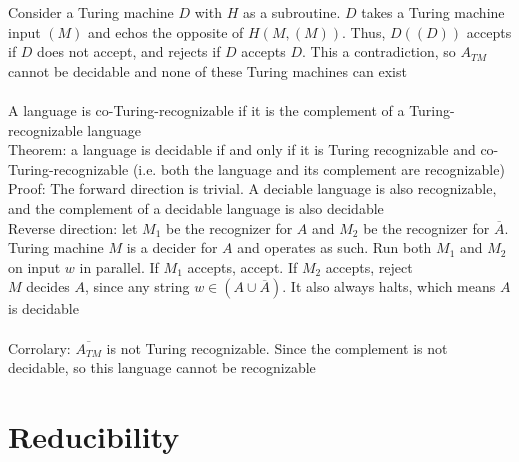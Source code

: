 \documentclass{article}
\newcommand*{\<}{\langle}
\renewcommand*{\>}{\rangle}
\begin{document}
			Consider a Turing machine $D$ with $H$ as a subroutine. $D$ takes a Turing machine input $(M)$ and echos the opposite of $H(M, (M))$. Thus, $D((D))$ accepts if $D$ does not accept, and rejects if $D$ accepts $D$. This a contradiction, so $A_{TM}$ cannot be decidable and none of these Turing machines can exist \\
			\\
			A language is co-Turing-recognizable if it is the complement of a Turing-recognizable language \\
			Theorem: a language is decidable if and only if it is Turing recognizable and co-Turing-recognizable (i.e. both the language and its complement are recognizable) \\
			Proof: The forward direction is trivial. A deciable language is also recognizable, and the complement of a decidable language is also decidable \\
			Reverse direction: let $M_1$ be the recognizer for $A$ and $M_2$ be the recognizer for $\overline{A}$. Turing machine $M$ is a decider for $A$ and operates as such. Run both $M_1$ and $M_2$ on input $w$ in parallel. If $M_1$ accepts, accept. If $M_2$ accepts, reject \\
			$M$ decides $A$, since any string $w \in (A \cup \overline{A})$. It also always halts, which means $A$ is decidable \\
			\\
			Corrolary: $\overline{A_{TM}}$ is not Turing recognizable. Since the complement is not decidable, so this language cannot be recognizable
		\clearpage

	\section{Reducibility}
\end{document}

